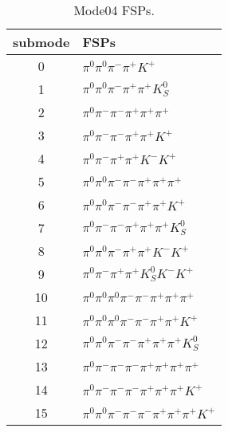 \begin{table}[h!]
\begin{center}
\begin{tabular}{cl}
\hline
submode& FSPs\\
\hline
0 & $\pi^0 \pi^0 \pi^- \pi^+ K^+ $ \\
1 & $\pi^0 \pi^0 \pi^- \pi^+ \pi^+ K_S^0 $ \\
2 & $\pi^0 \pi^- \pi^- \pi^+ \pi^+ \pi^+ $ \\
3 & $\pi^0 \pi^- \pi^- \pi^+ \pi^+ K^+ $ \\
4 & $\pi^0 \pi^- \pi^+ \pi^+ K^- K^+ $ \\
5 & $\pi^0 \pi^0 \pi^- \pi^- \pi^+ \pi^+ \pi^+ $ \\
6 & $\pi^0 \pi^0 \pi^- \pi^- \pi^+ \pi^+ K^+ $ \\
7 & $\pi^0 \pi^- \pi^- \pi^+ \pi^+ \pi^+ K_S^0 $ \\
8 & $\pi^0 \pi^0 \pi^- \pi^+ \pi^+ K^- K^+ $ \\
9 & $\pi^0 \pi^- \pi^+ \pi^+ K_S^0 K^- K^+ $ \\
10 & $\pi^0 \pi^0 \pi^0 \pi^- \pi^- \pi^+ \pi^+ \pi^+ $ \\
11 & $\pi^0 \pi^0 \pi^0 \pi^- \pi^- \pi^+ \pi^+ K^+ $ \\
12 & $\pi^0 \pi^0 \pi^- \pi^- \pi^+ \pi^+ \pi^+ K_S^0 $ \\
13 & $\pi^0 \pi^- \pi^- \pi^- \pi^+ \pi^+ \pi^+ \pi^+ $ \\
14 & $\pi^0 \pi^- \pi^- \pi^- \pi^+ \pi^+ \pi^+ K^+ $ \\
15 & $\pi^0 \pi^0 \pi^- \pi^- \pi^- \pi^+ \pi^+ \pi^+ K^+ $ \\
\hline
\end{tabular}
\label{tab:Mode04FSPs}
\caption{Mode04 FSPs.}
\end{center}
\end{table}
